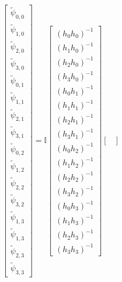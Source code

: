 \documentclass[a4paper,10pt]{scrreprt}
\begin{document}
\begin{equation}
    \begin{bmatrix}
        \tilde{\psi}_{0,0} \\
        \tilde{\psi}_{1,0} \\
        \tilde{\psi}_{2,0} \\
        \tilde{\psi}_{3,0} \\
        \tilde{\psi}_{0,1} \\
        \tilde{\psi}_{1,1} \\
        \tilde{\psi}_{2,1} \\
        \tilde{\psi}_{3,1} \\
        \tilde{\psi}_{0,2} \\
        \tilde{\psi}_{1,2} \\
        \tilde{\psi}_{2,2} \\
        \tilde{\psi}_{3,2} \\
        \tilde{\psi}_{1,3} \\
        \tilde{\psi}_{1,3} \\
        \tilde{\psi}_{2,3} \\
        \tilde{\psi}_{3,3}
    \end{bmatrix}
    =
    \mathbb{I}
    \begin{bmatrix}
        \left(h_0 h_0 \right)^{-1} \\
        \left(h_1 h_0 \right)^{-1} \\
        \left(h_2 h_0 \right)^{-1} \\
        \left(h_3 h_0 \right)^{-1} \\
        \left(h_0 h_1 \right)^{-1} \\
        \left(h_1 h_1 \right)^{-1} \\
        \left(h_2 h_1 \right)^{-1} \\
        \left(h_3 h_1 \right)^{-1} \\
        \left(h_0 h_2 \right)^{-1} \\
        \left(h_1 h_2 \right)^{-1} \\
        \left(h_2 h_2 \right)^{-1} \\
        \left(h_3 h_2 \right)^{-1} \\
        \left(h_0 h_3 \right)^{-1} \\
        \left(h_1 h_3 \right)^{-1} \\
        \left(h_2 h_3 \right)^{-1} \\
        \left(h_3 h_3 \right)^{-1}
    \end{bmatrix}
    \begin{bmatrix}

\end{bmatrix}
\end{equation}
\end{document}
